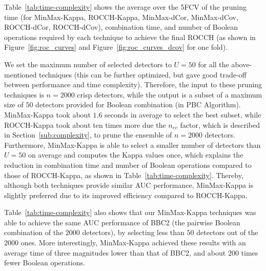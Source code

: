 Table~\ref{tab:time-complexity} shows the average over the 5FCV of the  pruning time (for MinMax-Kappa,  ROCCH-Kappa, MinMax-dCor, MinMax-dCov, ROCCH-dCor, ROCCH-dCov), combination time, and number of Boolean operations required by each technique to achieve the final ROCCH (as shown in  Figure~\ref{fig:roc_curves} and  Figure~\ref{fig:roc_curves_dcov} for one fold).  

We set the maximum number of selected detectors to $U=50$ for all the above-mentioned techniques (this can be further optimized, but gave good trade-off between performance and time complexity).
Therefore, the input to these pruning techniques is $n=2000$ crisp detectors, while the output is a subset of a maximum size of $50$ detectors provided for Boolean combination (in PBC Algorithm).
MinMax-Kappa took about $1.6$ seconds in average to select the best subset, while ROCCH-Kappa took about ten times more due the $n_{ev}$ factor, which is described in Section~\ref{sub:complexity}, to prune the ensemble of $n=2000$ detectors.
Furthermore, MinMax-Kappa is able to select a smaller number of detectors than $U=50$ on average and computes the Kappa values once, which explains the reduction in combination time and number of Boolean operations compared to those of ROCCH-Kappa, as shown in Table~\ref{tab:time-complexity}.
Thereby, although both techniques provide similar AUC performance, MinMax-Kappa is slightly preferred due to its improved efficiency  compared to ROCCH-Kappa.

Table~\ref{tab:time-complexity} also shows that our MinMax-Kappa techniques was able to achieve the same AUC performance of BBC2 (the pairwise Boolean combination of the $2000$ detectors), by selecting less than $50$ detectors out of the $2000$ ones.
More interestingly, MinMax-Kappa achieved these results with an average time of three magnitudes lower than that of BBC2, and about 200 times fewer Boolean operations.

